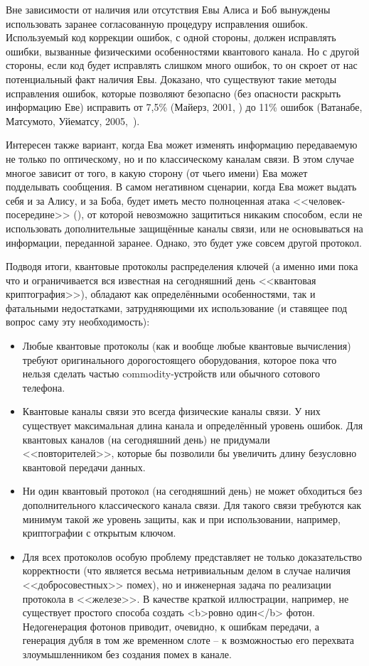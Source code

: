 Вне зависимости от наличия или отсутствия Евы Алиса и Боб вынуждены использовать заранее согласованную процедуру исправления ошибок. Используемый код коррекции ошибок, с одной стороны, должен исправлять ошибки, вызванные физическими особенностями квантового канала. Но с другой стороны, если код будет исправлять слишком много ошибок, то он скроет от нас потенциальный факт наличия Евы. Доказано, что существуют такие методы исправления ошибок, которые позволяют безопасно (без опасности раскрыть информацию Еве) исправить от 7,5\% (Майерз, 2001, \cite{Mayers:2001}) до 11\% ошибок (Ватанабе, Матсумото, Уйематсу, 2005,~\cite{Watanabe:Matsumoto:Uyematsu:2005}).

Интересен также вариант, когда Ева может изменять информацию передаваемую не только по оптическому, но и по классическому каналам связи. В этом случае многое зависит от того, в какую сторону (от чьего имени) Ева может подделывать сообщения. В самом негативном сценарии, когда Ева может выдать себя и за Алису, и за Боба, будет иметь место полноценная атака <<человек-посередине>> (), от которой невозможно защититься никаким способом, если не использовать дополнительные защищённые каналы связи, или не основываться на информации, переданной заранее. Однако, это будет уже совсем другой протокол.

Подводя итоги, квантовые протоколы распределения ключей (а именно ими пока что и ограничивается вся известная на сегодняшний день <<квантовая криптография>>), обладают как определёнными особенностями, так и фатальными недостатками, затрудняющими их использование (и ставящее под вопрос саму эту необходимость):

\begin{itemize}
	\item Любые квантовые протоколы (как и вообще любые квантовые вычисления) требуют оригинального дорогостоящего оборудования, которое пока что нельзя сделать частью commodity-устройств или обычного сотового телефона.
	\item Квантовые каналы связи это всегда физические каналы связи. У них существует максимальная длина канала и определённый уровень ошибок. Для квантовых каналов (на сегодняшний день) не придумали <<повторителей>>, которые бы позволили бы увеличить длину безусловно квантовой передачи данных.
	\item Ни один квантовый протокол (на сегодняшний день) не может обходиться без дополнительного классического канала связи. Для такого связи требуются как минимум такой же уровень защиты, как и при использовании, например, криптографии с открытым ключом.
	\item Для всех протоколов особую проблему представляет не только доказательство корректности (что является весьма нетривиальным делом в случае наличия <<добросовестных>> помех), но и инженерная задача по реализации протокола в <<железе>>. В качестве краткой иллюстрации, например, не существует простого способа создать <b>ровно один</b> фотон. Недогенерация фотонов приводит, очевидно, к ошибкам передачи, а генерация дубля в том же временном слоте -- к возможностью его перехвата злоумышленником без создания помех в канале.
\end{itemize}

